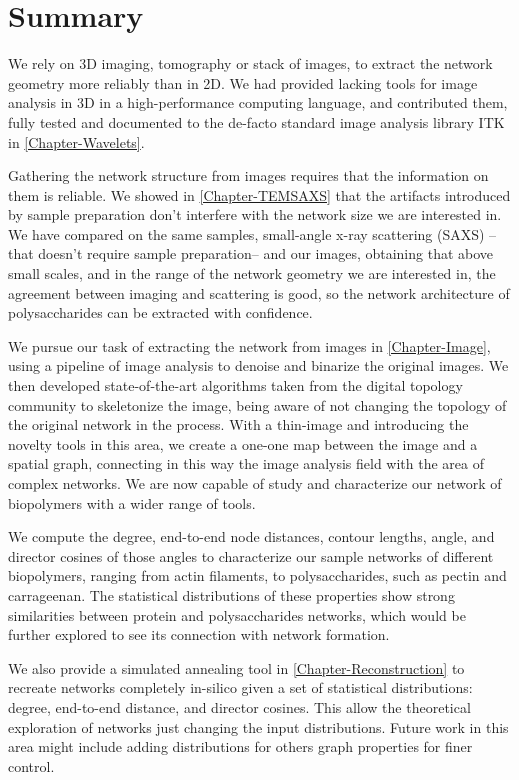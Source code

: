 \section{Summary}%
\label{sec:conclusions_summary}

We rely on 3D imaging, tomography or stack of images, to extract the network geometry more reliably than in 2D. We had provided lacking tools for image analysis in 3D in a high-performance computing language, and contributed them, fully tested and documented to the de-facto standard image analysis library ITK in \autoref{Chapter-Wavelets}.

Gathering the network structure from images requires that the information on them is reliable. We showed in \autoref{Chapter-TEMSAXS} that the artifacts introduced by sample preparation don't interfere with the network size we are interested in. We have compared on the same samples, small-angle x-ray scattering (SAXS) --that doesn't require sample preparation-- and our images, obtaining that above small scales, and in the range of the network geometry we are interested in, the agreement between imaging and scattering is good, so the network architecture of polysaccharides can be extracted with confidence.

We pursue our task of extracting the network from images in \autoref{Chapter-Image}, using a pipeline of image analysis to denoise and binarize the original images. We then developed state-of-the-art algorithms taken from the digital topology community to skeletonize the image, being aware of not changing the topology of the original network in the process. With a thin-image and introducing the novelty tools in this area, we create a one-one map between the image and a spatial graph, connecting in this way the image analysis field with the area of complex networks. We are now capable of study and characterize our network of biopolymers with a wider range of tools.

We compute the degree, end-to-end node distances, contour lengths, angle, and director cosines of those angles to characterize our sample networks of different biopolymers, ranging from actin filaments, to polysaccharides, such as pectin and carrageenan. The statistical distributions of these properties show strong similarities between protein and polysaccharides networks, which would be further explored to see its connection with network formation.

We also provide a simulated annealing tool in \autoref{Chapter-Reconstruction} to recreate networks completely in-silico given a set of statistical distributions: degree, end-to-end distance, and director cosines. This allow the theoretical exploration of networks just changing the input distributions. Future work in this area might include adding distributions for others graph properties for finer control.

